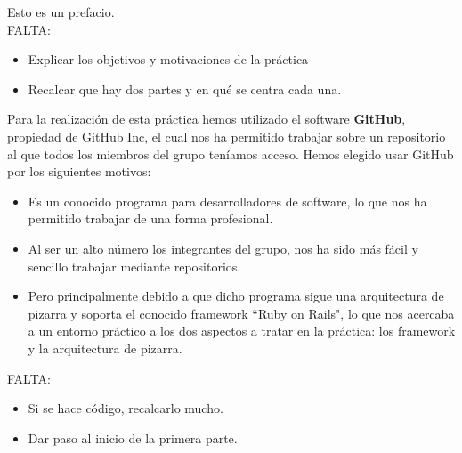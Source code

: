 \lettrine[lines=1,slope=4pt,findent=0pt]{E}{}sto es un prefacio.\\

\color{red}
FALTA:
\begin{itemize}
\item Explicar los objetivos y motivaciones de la práctica
\item Recalcar que hay dos partes y en qué se centra cada una.
\end{itemize}
\color{black}

Para la realización de esta práctica hemos utilizado el software \textbf{GitHub}, propiedad de 	{GitHub Inc}, el cual nos ha permitido trabajar sobre un repositorio al que todos los miembros del grupo teníamos acceso. Hemos elegido usar GitHub por los siguientes motivos:
\begin{itemize}
	\item Es un conocido programa para desarrolladores de software, lo que nos ha permitido trabajar de una forma profesional.
	\item Al ser un alto número los integrantes del grupo, nos ha sido más fácil y sencillo trabajar mediante repositorios. 
	\item Pero principalmente debido a que dicho programa sigue una arquitectura de pizarra y soporta el conocido framework ``Ruby on Rails", lo que nos acercaba a un entorno práctico a los dos aspectos a tratar en la práctica: los framework y la arquitectura de pizarra.
\end{itemize}

\color{red}
FALTA:
\begin{itemize}
\item Si se hace código, recalcarlo mucho.
\item Dar paso al inicio de la primera parte.
\end{itemize}
\color{black}